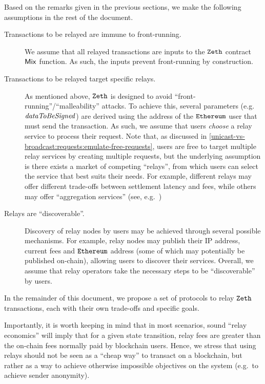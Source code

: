 Based on the remarks given in the previous sections, we make the following assumptions in the rest of the document.
\begin{description}
    \item[Transactions to be relayed are immune to front-running.] We assume that all relayed transactions are inputs to the $\texttt{Zeth}$ contract $\mathsf{Mix}$ function. As such, the inputs prevent front-running by construction.
    \item[Transactions to be relayed target specific relays.] As mentioned above, $\texttt{Zeth}$ is designed to avoid ``front-running''/``malleability'' attacks. To achieve this, several parameters (e.g.~$\mathit{dataToBeSigned}$) are derived using the address of the $\texttt{Ethereum}$ user that must send the transaction. As such, we assume that users \emph{choose} a relay service to process their request. Note that, as discussed in \cref{unicast-vs-broadcast:requests:emulate-free-requests}, users are free to target multiple relay services by creating multiple requests, but the underlying assumption is there exists a market of competing ``relays'', from which users can select the service that best suits their needs. For example, different relays may offer different trade-offs between settlement latency and fees, while others may offer ``aggregation services'' (see, e.g.~\cite{DBLP:journals/corr/abs-2008-05958})
    \item[Relays are ``discoverable''.] Discovery of relay nodes by users may be achieved through several possible mechanisms. For example, relay nodes may publish their IP address, current fees and $\texttt{Ethereum}$ address (some of which may potentially be published on-chain), allowing users to discover their services. Overall, we assume that relay operators take the necessary steps to be ``discoverable'' by users.
\end{description}

In the remainder of this document, we propose a set of protocols to relay $\texttt{Zeth}$ transactions, each with their own trade-offs and specific goals.

\begin{notebox}
    Importantly, it is worth keeping in mind that in most scenarios, sound ``relay economics'' will imply that for a given state transition, relay fees are greater than the on-chain fees normally paid by blockchain users. Hence, we stress that using relays should not be seen as a ``cheap way'' to transact on a blockchain, but rather as a way to achieve otherwise impossible objectives on the system (e.g.~to achieve sender anonymity).
\end{notebox}
